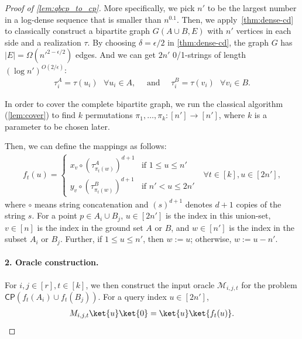 \begin{proof}[Proof of \cref{lem:qbcp_to_cp}]
More specifically, we pick $n'$ to be the largest number in a log-dense sequence that is smaller than $n^{0.1}$. Then, we apply~\cref{thm:dense-cd} to classically construct a bipartite graph $G(A\cup B,E)$ with $n'$ vertices in each side and a realization $\tau$.
By choosing $\delta = \epsilon/2$ in \cref{thm:dense-cd}, the graph $G$ has $|E|=\Omega(n'^{2-\epsilon/2})$ edges. And we can get $2n'$ 0/1-strings of length $(\log n')^{O(2/\epsilon)}$:
\begin{align}
    \tau^A_i=\tau(u_i)~~~\forall u_i\in A, \quad\text{ and }\quad
    \tau^B_i=\tau(v_i)~~~\forall v_i\in B.
\end{align}

In order to cover the complete bipartite graph, we run the classical algorithm (\cref{lem:cover}) to find $k$ permutations $\pi_1,\dots, \pi_k:[n']\rightarrow [n']$, where $k$ is a parameter to be chosen later.

Then, we can define the mappings as follows:  
\begin{align}\label{eq:fcn_cp}
    f_t(u)=
    \begin{cases}
        x_v\circ \left(\tau^A_{\pi_t(w)}\right)^{d+1} & \text{if }1\leq u\leq n'\\
        y_v\circ \left(\tau^B_{\pi_t(w)}\right)^{d+1} & \text{if }n'<u\leq 2n'
    \end{cases} ~~~\forall t\in [k], u\in [2n'],
\end{align}
where $\circ$ means string concatenation and $(s)^{d+1}$ denotes $d+1$ copies of the string $s$. For a point $p\in A_i\cup B_j$, $u\in [2n']$ is the index in this union-set,  $v\in [n]$ is the index in the ground set $A$ or $B$, and $w\in [n']$ is the index in the subset $A_i$ or $B_j$. Further, if $1\leq u\leq n'$, then $w:=u$; otherwise, $w:=u-n'$.

\paragraph{2. Oracle construction.}
For $i,j\in [r],t\in [k]$, we then construct the input oracle $\mathcal{M}_{i,j,t}$ for the problem $\textsf{CP}(f_t(A_i)\cup f_t(B_j))$. For a query index $u\in [2n']$, 
\begin{align}\label{eq:oracle_cp}
    M_{i,j,t}\ket{u}\ket{0}=\ket{u}\ket{f_t(u)}.
\end{align}


\end{proof}
